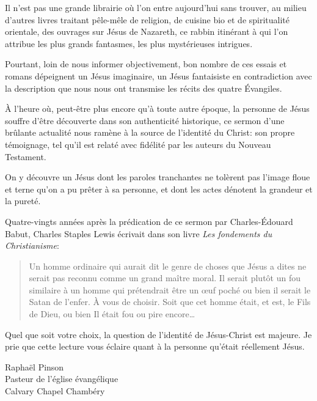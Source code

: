 
\begin{preface}
Il n'est pas une grande librairie où l'on entre aujourd'hui sans trouver,
au milieu d'autres livres traitant pêle-mêle de religion, de cuisine bio et de spiritualité orientale,
des ouvrages sur Jésus de Nazareth, ce rabbin itinérant à qui l'on attribue les plus grands
fantasmes, les plus mystérieuses intrigues.

Pourtant, loin de nous informer objectivement, bon nombre de ces essais et romans
dépeignent un Jésus imaginaire, un Jésus fantaisiste en contradiction avec
la description que nous nous ont transmise les récits des quatre \'Evangiles.

\`A l'heure où, peut-être plus encore qu'à toute autre époque, la personne de Jésus
souffre d'être découverte dans son authenticité historique, ce sermon d'une brûlante actualité
nous ramène à la source de l'identité du Christ: son propre témoignage,
tel qu'il est relaté avec fidélité par les auteurs du Nouveau Testament.

On y découvre un Jésus dont les paroles tranchantes ne tolèrent pas l'image
floue et terne qu'on a pu prêter à sa personne,
et dont les actes dénotent la grandeur et la pureté.

Quatre-vingts années après la prédication de ce sermon par Charles-\'Edouard Babut, Charles Staples Lewis
écrivait dans son livre \emph{Les fondements du Christianisme}:

\begin{quote}
\quotefont
Un homme ordinaire qui aurait dit le genre de choses que Jésus
a dites ne serait pas reconnu comme un grand maître moral.
Il serait plutôt un fou \ocadr similaire à un homme qui prétendrait être un œuf poché \fcadr ou bien il serait le Satan de l'enfer.
À vous de choisir. Soit que cet homme était, et est, le Fils de Dieu, ou bien Il était fou ou pire encore…
\end{quote}


Quel que soit votre choix, la question de l'identité de Jésus-Christ est majeure. Je prie que cette lecture vous éclaire quant à la personne qu'était réellement Jésus.


\begin{flushright}
Raphaël Pinson\\
Pasteur de l'église évangélique\\
Calvary Chapel Chambéry
\end{flushright}

\end{preface}


